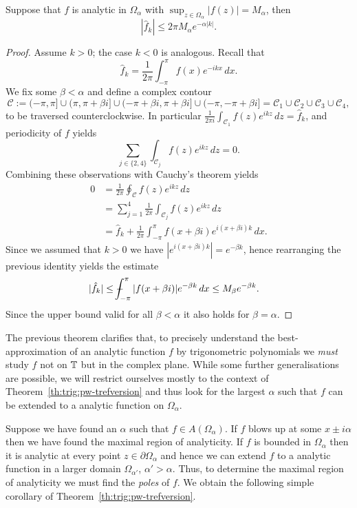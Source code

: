 \begin{theorem} \label{th:trig:pw-trefversion}
  Suppose that $f$ is analytic in $\Omega_\alpha$ with
  $\sup_{z \in \Omega_\alpha} |f(z)| = M_\alpha$, then
  \[
    |\hat{f}_k| \leq 2\pi M_\alpha e^{-\alpha|k|}.
  \]
\end{theorem}
\begin{proof}
  Assume $k > 0$; the case $k < 0$ is analogous.
  Recall that
  \[
    \hat{f}_k = \frac{1}{2\pi} \int_{-\pi}^\pi f(x) e^{-ikx} \,dx.
  \]
  We fix some $\beta < \alpha$ and define a complex contour
  \[
    \mathcal{C} := (-\pi, \pi] \cup (\pi, \pi+ \beta i]
        \cup (-\pi + \beta i, \pi + \beta i] \cup (-\pi, -\pi + \beta i]
      = \mathcal{C}_{1} \cup \mathcal{C}_{2}
        \cup \mathcal{C}_{3} \cup \mathcal{C}_{4},
  \]
  to be traversed counterclockwise. In particular $\frac{1}{2\pi i} \int_{\mathcal{C}_1} f(z) e^{ikz} \, dz = \hat{f}_k$, and periodicity of $f$ yields
  \[
      \sum_{j \in \{2, 4\}}  \int_{\mathcal{C}_j} f(z) e^{ikz} \, dz = 0.
  \]
  Combining these observations with Cauchy's theorem yields
  \begin{align*}
      0
      &= \frac{1}{2\pi} \oint_{\mathcal{C}} f(z) e^{ikz} \, dz \\
      &= \sum_{j = 1}^4\frac{1}{2\pi} \int_{\mathcal{C}_j} f(z) e^{ikz} \, dz  \\
      &= \hat{f}_k + \frac{1}{2\pi} \int_{-\pi}^\pi f(x + \beta i) e^{i (x+\beta i) k} \, dx.
  \end{align*}
  Since we assumed that $k > 0$ we have $|e^{i (x+\beta i)k}| = e^{-\beta k}$, hence
  rearranging the previous identity yields the estimate
  \begin{align*}
    |\hat{f}_k| &\leq \mint_{-\pi}^\pi |f(x+\beta i)| e^{-\beta k} \,dx
      \leq M_\beta e^{-\beta k}.
  \end{align*}
  Since the upper bound valid for all $\beta < \alpha$ it also holds for $\beta
  = \alpha$.
\end{proof}

The previous theorem clarifies that, to precisely understand the
best-approximation of an analytic function $f$ by  trigonometric polynomials
we {\em must} study $f$ not on $\mathbb{T}$ but in the complex plane. While some
further generalisations are possible, we will restrict ourselves mostly
to the context of Theorem~\ref{th:trig:pw-trefversion} and thus look for the
largest $\alpha$ such that $f$ can be extended to a analytic function
on $\Omega_\alpha$.

Suppose we have found an $\alpha$ such that $f \in A(\Omega_\alpha)$. If $f$
blows up at some $x \pm i \alpha$ then we have found the maximal region of
analyticity. If $f$ is bounded in $\Omega_\alpha$ then it is analytic at every
point $z \in \partial \Omega_\alpha$ and hence we can extend $f$ to a
analytic function in a larger domain $\Omega_{\alpha'}$, $\alpha' > \alpha$.
Thus, to determine the maximal region of analyticity we must find the {\em
poles} of $f$. We obtain the following simple corollary of Theorem~\ref{th:trig:pw-trefversion}.

